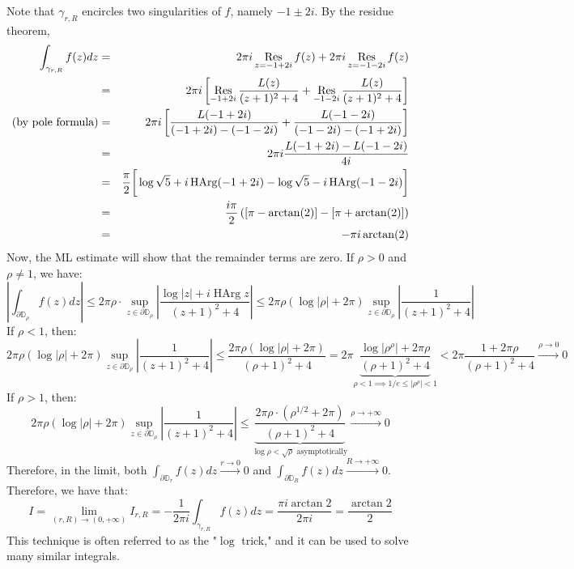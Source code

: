 \begin{framed}
       Note that $\gamma_{r,R}$ encircles two singularities of $f$, namely $-1\pm 2i$. By the residue theorem, \begin{eqnarray*}
    \int_{\gamma_{r,R}} f(z)dz &=& 2\pi i \mathop{\mathrm{Res}}_{z=-1+2i} f(z) + 2\pi i \mathop{\mathrm{Res}}_{z=-1-2i} f(z)\\
    &=& 2\pi i \left[\mathop{\mathrm{Res}}_{-1+2i} \frac{L(z)}{(z+1)^2+4} + \mathop{\mathrm{Res}}_{-1-2i} \frac{L(z)}{(z+1)^2+4}\right]\\
    \text{(by pole formula)} &=& 2\pi i \left[\frac{L(-1+2i)}{(-1+2i)-(-1-2i)} + \frac{L(-1-2i)}{(-1-2i)-(-1+2i)}\right]\\
    &=& 2\pi i \frac{L(-1+2i)-L(-1-2i)}{4i}\\
    &=& \frac{\pi}{2} \bigg[\log \sqrt{5} + i\operatorname{HArg}(-1+2i) - \log \sqrt{5} - i\operatorname{HArg}(-1-2i)\bigg]\\
    &=& \frac{i\pi}{2} \left([\pi - \arctan(2)] - [\pi + \arctan(2)]\right)\\
    &=& - \pi i \arctan(2)
\end{eqnarray*} Now, the ML estimate will show that the remainder terms are zero. If $\rho>0$ and $\rho \neq 1$, we have: \[\left|\int_{\partial\mathbb{D}_\rho} f(z)dz\right| \leq 2\pi \rho \cdot \sup_{z\in \partial\mathbb{D}_\rho} \left|\frac{\log |z| + i\operatorname{HArg}z}{(z+1)^2+4}\right| \leq 2\pi \rho (\log |\rho|+ 2\pi) \sup_{z\in\partial\mathbb{D}_\rho} \left|\frac{1}{(z+1)^2 + 4}\right|\] If $\rho < 1$, then: \[2\pi \rho (\log |\rho|+ 2\pi) \sup_{z\in\partial\mathbb{D}_\rho} \left|\frac{1}{(z+1)^2 + 4}\right| \leq \frac{2\pi \rho (\log |\rho| + 2\pi)}{(\rho + 1)^2 + 4} = 2\pi \underbrace{\frac{\log |\rho^\rho| + 2\pi \rho}{(\rho+1)^2 + 4}}_{\rho < 1 \implies1/e\leq|\rho^\rho| < 1} < 2\pi \frac{1+2\pi \rho}{(\rho+1)^2+4} \xrightarrow[]{\rho \to 0} 0\] If $\rho>1$, then: \[2\pi \rho (\log |\rho|+ 2\pi) \sup_{z\in\partial\mathbb{D}_\rho} \left|\frac{1}{(z+1)^2 + 4}\right| \leq \underbrace{\frac{2\pi \rho\cdot (\rho^{1/2}+2\pi)}{(\rho+1)^2+4}}_{\log \rho < \sqrt{\rho}\text{ asymptotically}} \xrightarrow[]{\rho \to +\infty} 0\] Therefore, in the limit, both $\int_{\partial\mathbb{D}_r} f(z)dz \xrightarrow[]{r\to 0} 0$ and $\int_{\partial\mathbb{D}_R} f(z)dz \xrightarrow[]{R\to +\infty} 0$. Therefore, we have that: \[I = \lim_{(r,R)\to(0,+\infty)} I_{r,R} = -\frac{1}{2\pi i}\int_{\gamma_{r,R}} f(z)dz  = \frac{\pi i\arctan 2}{2\pi i} = \boxed{\frac{\arctan 2}{2}}\] This technique is often referred to as the "$\log$ trick," and it can be used to solve many similar integrals.
\end{framed}

